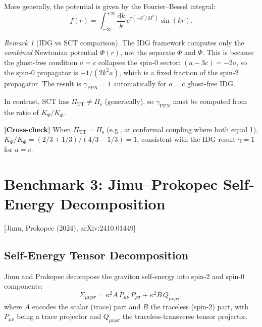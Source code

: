\documentclass[11pt,a4paper]{article}
\theoremstyle{plain}
\theoremstyle{definition}
\theoremstyle{remark}
\newtheorem{remark}[theorem]{Remark}
\renewcommand{\dd}{\mathrm{d}}
\newcommand{\fromlit}[1]{\textcolor{blue!70!black}{\textsf{[#1]}}}
\newcommand{\crosscheck}[1]{%
  \par\smallskip\noindent
  \colorbox{blue!10}{\parbox{\dimexpr\linewidth-2\fboxsep}{%
    \textcolor{blue!50!black}{\textbf{[Cross-check]}} #1}}%
  \par\smallskip}
\begin{document}
More generally, the potential is given by the Fourier--Bessel integral:
\begin{equation}\label{eq:f-integral}
  f(r) = \int_{-\infty}^{+\infty}\frac{\dd k}{k}\,
  e^{\tau(-k^2/M^2)}\sin(kr).
\end{equation}

\begin{remark}[IDG vs SCT comparison]\label{rem:idg-vs-sct}
The IDG framework computes only the \emph{combined} Newtonian
potential $\Phi(r)$, not the separate $\Phi$ and $\Psi$.
This is because the ghost-free condition $a = c$ collapses the
spin-0 sector: $(a - 3c) = -2a$, so the spin-0 propagator is
$-1/(2k^2 a)$, which is a fixed fraction of the spin-2 propagator.
The result is $\gamma_{\mathrm{PPN}} = 1$ automatically for $a = c$
ghost-free IDG.

In contrast, SCT has $\Pi_{\mathrm{TT}} \neq \Pi_{\mathrm{s}}$
(generically), so $\gamma_{\mathrm{PPN}}$ must be computed
from the ratio of $K_\Psi/K_\Phi$.
\end{remark}

\crosscheck{When $\Pi_{\mathrm{TT}} = \Pi_{\mathrm{s}}$
(e.g., at conformal coupling where both equal 1), $K_\Psi/K_\Phi
= (2/3 + 1/3)/(4/3 - 1/3) = 1$, consistent with the IDG result
$\gamma = 1$ for $a = c$.}

\section{Benchmark 3: Jimu--Prokopec Self-Energy Decomposition}
\label{sec:jimu}

\fromlit{Jimu, Prokopec (2024), arXiv:2410.01449}

\subsection{Self-Energy Tensor Decomposition}

Jimu and Prokopec decompose the graviton self-energy into spin-2
and spin-0 components:
\begin{equation}\label{eq:self-energy}
  \Sigma_{\mu\nu\rho\sigma}
  = \kappa^2 A\, P_{\mu\nu}\, P_{\rho\sigma}
  + \kappa^2 B\, Q_{\mu\nu\rho\sigma},
\end{equation}
where $A$ encodes the scalar (trace) part and $B$ the traceless
(spin-2) part, with $P_{\mu\nu}$ being a trace projector and
$Q_{\mu\nu\rho\sigma}$ the traceless-transverse tensor projector.
\end{document}
